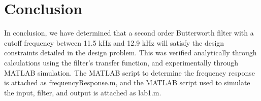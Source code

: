 \documentclass[12pt]{article}
\begin{document}
\clearpage
\section*{Conclusion}
In conclusion, we have determined that a second order Butterworth filter with a cutoff frequency between 11.5 kHz and 12.9 kHz will satisfy the design constraints detailed in the design problem. This was verified analytically through calculations using the filter's transfer function, and experimentally through MATLAB simulation. The MATLAB script to determine the frequency response is attached as frequencyResponse.m, and the MATLAB script used to simulate the input, filter, and output is attached as lab1.m.
\end{document}
